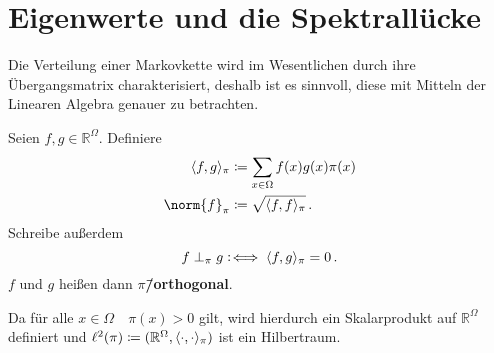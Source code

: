 \documentclass[ngerman,a4paper,11pt]{scrartcl}
\newcommand\coloniff{\vcentcolon\!\iff}
\newcommand{\RR}{\mathbb{R}}
\DeclarePairedDelimiter{\sprod}{\langle}{\rangle}	%
\begin{document}
\section{Eigenwerte und die Spektrallücke}
Die Verteilung einer Markovkette wird im Wesentlichen durch ihre Übergangsmatrix
charakterisiert, deshalb ist es sinnvoll, diese mit Mitteln der Linearen
Algebra genauer zu betrachten.

\begin{defn}
  Seien $f, g\in\RR^\Omega$. Definiere
  \begin{align*}
    \sprod{f,g}_\pi&\coloneqq\sum_{x\in\Omega}f(x)g(x)\pi(x) \\
    \norm{f}_\pi&\coloneqq\sqrt{\sprod{f,f}_\pi} \, .
  \end{align*}
 Schreibe außerdem
 \begin{equation*}
  f\perp_\pi g\coloniff\sprod{f,g}_\pi=0\, .
 \end{equation*}
 $f$ und $g$ heißen dann \textbf{$\pi$\=/orthogonal}.
\end{defn}

\begin{rem}
 Da für alle $x\in\Omega\quad\pi(x)>0$ gilt, wird hierdurch ein Skalarprodukt auf
 $\RR^\Omega$ definiert und $\ell^2(\pi)\coloneqq(\RR^\Omega,
 \sprod{\cdot,\cdot}_\pi)$ ist ein Hilbertraum.
\end{rem}
\end{document}
